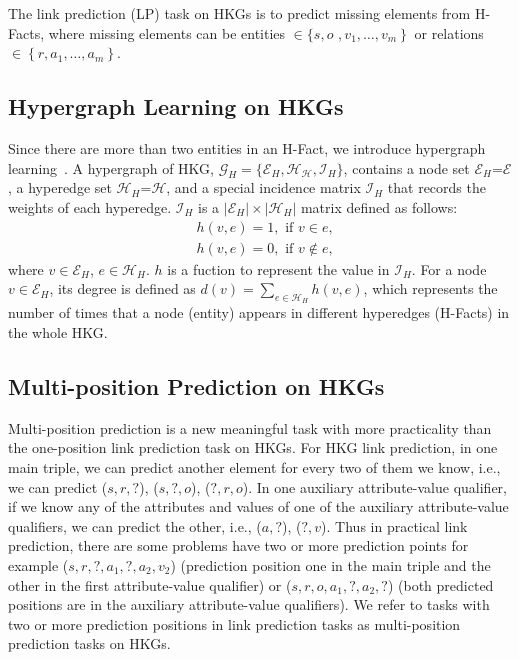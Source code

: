 \documentclass[11pt]{article}
\begin{document}
The link prediction (LP) task on HKGs is to predict missing elements from H-Facts, where missing elements can be entities $\in\{s, o$ $\left., v_{1}, \ldots, v_{m}\right\}$ or relations $\in\left\{r, a_{1}, \ldots, a_{m}\right\}$. 


\subsection{Hypergraph Learning on HKGs} 
Since there are more than two entities in an H-Fact, we introduce hypergraph learning~\citep{HGNN}. A hypergraph of HKG, $\mathcal{G}_H=\{\mathcal{E}_H, \mathcal{H_H}, \mathcal{I}_H\}$, contains a node set $\mathcal{E}_H$=$\mathcal{E}$, a hyperedge set $\mathcal{H}_H$=$\mathcal{H}$, and a special incidence matrix $\mathcal{I}_H$ that records the weights of each hyperedge. $\mathcal{I}_H$ is a $|\mathcal{E}_H| \times|\mathcal{H}_H|$ matrix defined as follows:
\begin{equation}
\begin{aligned}
&h(v, e)=1, \text { if } v \in e, \\
&h(v, e)=0, \text { if } v \notin e,
\end{aligned}
\end{equation}
where $v \in \mathcal{E}_H$, $e \in \mathcal{H}_H$. $h$ is a fuction to represent the value in $\mathcal{I}_H$. For a node $v \in \mathcal{E}_H$, its degree is defined as $d(v)=\sum_{e \in \mathcal{H}_H}h(v, e)$, which represents the number of times that a node (entity) appears in different hyperedges (H-Facts) in the whole HKG.









\subsection{Multi-position Prediction on HKGs} 
Multi-position prediction is a new meaningful task with more practicality than the one-position link prediction task on HKGs. For HKG link prediction, in one main triple, we can predict another element for every two of them we know, i.e., we can predict ($s,r,? $), ($s,? ,o$), ($? ,r,o$). In one auxiliary attribute-value qualifier, if we know any of the attributes and values of one of the auxiliary attribute-value qualifiers, we can predict the other, i.e., ($a,? $), ($? ,v$). Thus in practical link prediction, there are some problems have two or more prediction points for example ($s,r,? ,a_1,? ,a_2,v_2$) (prediction position one in the main triple and the other in the first attribute-value qualifier) or ($s,r,o,a_1,? ,a_2,? $) (both predicted positions are in the auxiliary attribute-value qualifiers). We refer to tasks with two or more prediction positions in link prediction tasks as multi-position prediction tasks on HKGs. 
\end{document}
